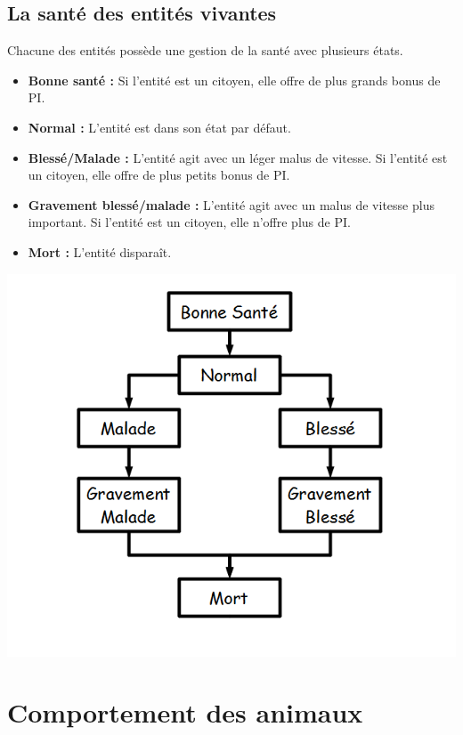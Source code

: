 \documentclass[a4paper]{article}
\begin{document}
      \subsection{La santé des entités vivantes}
        Chacune des entités possède une gestion de la santé avec plusieurs états.
        \begin{itemize} \small
          \item \textbf{Bonne santé :} Si l'entité est un citoyen, elle offre de plus grands bonus de PI.
          \item \textbf{Normal :} L'entité est dans son état par défaut.
          \item \textbf{Blessé/Malade :} L'entité agit avec un léger malus de vitesse. Si l'entité est un citoyen, elle offre de plus petits bonus de PI.
          \item \textbf{Gravement blessé/malade :} L'entité agit avec un malus de vitesse plus important. Si l'entité est un citoyen, elle n'offre plus de PI.
          \item \textbf{Mort :} L'entité disparaît.
        \end{itemize} \normalsize
        \label{DiagSante}
        \begin{center}
          \includegraphics[scale=0.5]{DiagrammeTransitionSante.png} 
        \end{center}
        
    \section{Comportement des animaux}
\end{document}
